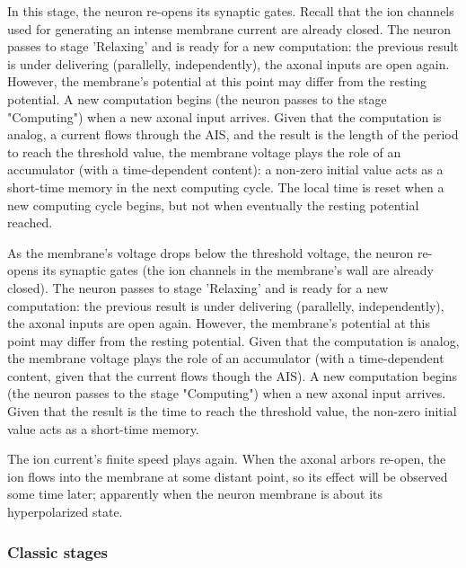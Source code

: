 In this stage,
the neuron re-opens its synaptic gates. Recall that the ion channels
used for generating an intense membrane current
are already closed. The neuron passes to stage 'Relaxing' and is ready for a new computation:
the previous result is under delivering (parallelly, independently),
the axonal inputs are open again. 
However, the membrane's potential at this point may differ from the
resting potential.  A new computation begins
(the neuron passes to the stage "Computing")
when a new axonal input arrives.  Given that the computation is analog, a current flows through the AIS, and the result is the length of the period to reach
the threshold value, the 
membrane voltage plays the role of an accumulator (with a time-dependent content): a non-zero initial value acts as a short-time memory in the next computing cycle.
The local time is reset when a new computing cycle begins, but not when eventually the resting potential reached.

As the membrane's voltage drops below the threshold voltage,
the neuron re-opens its synaptic gates (the ion channels in the membrane's wall
are already closed). The neuron passes to stage 'Relaxing' and is ready for a new computation:
the previous result is under delivering (parallelly, independently),
the axonal inputs are open again. 
However, the membrane's potential at this point may differ from the
resting potential. Given that the computation is analog, the 
membrane voltage plays the role of an accumulator (with a time-dependent content,
given that the current flows though the AIS). A new computation begins
(the neuron passes to the stage "Computing")
when a new axonal input arrives. Given that the result is the time to reach
the threshold value, the non-zero initial value acts as a short-time memory.



The ion current's finite speed plays again. When the axonal arbors re-open,
the ion flows into the membrane at some distant point, so its effect
will be observed some time later; apparently when the neuron membrane is
about its hyperpolarized state. 

\fi

\ifx\magyar\undefined

 
\subsubsection[Classic]{Classic stages\label{sec:Single-OperationClassicStages}}

